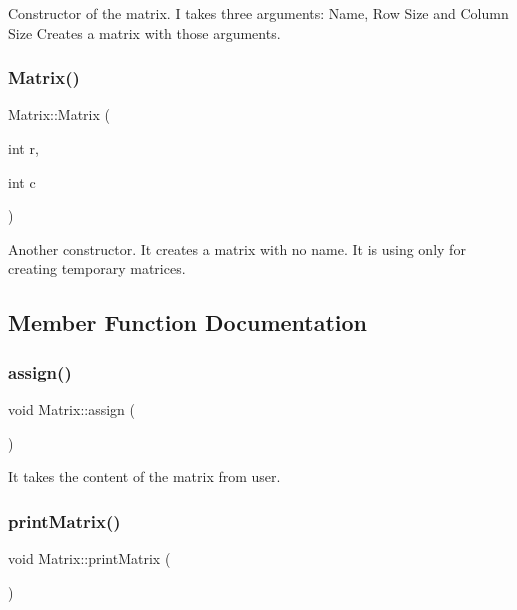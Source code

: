 Constructor of the matrix. I takes three arguments\+: Name, Row Size and Column Size Creates a matrix with those arguments. \mbox{\label{class_matrix_a07a3cee5bc286ca27ceffe81ce5a2d01}} 
\subsubsection{\texorpdfstring{Matrix()}{Matrix()}\hspace{0.1cm}{\footnotesize\ttfamily [2/2]}}
{\footnotesize\ttfamily Matrix\+::\+Matrix (\begin{DoxyParamCaption}\item[{int}]{r,  }\item[{int}]{c }\end{DoxyParamCaption})}



Another constructor. It creates a matrix with no name. It is using only for creating temporary matrices. 



\subsection{Member Function Documentation}
\mbox{\label{class_matrix_a5514edd105f92133665eee545230e3fd}} 
\subsubsection{\texorpdfstring{assign()}{assign()}}
{\footnotesize\ttfamily void Matrix\+::assign (\begin{DoxyParamCaption}{ }\end{DoxyParamCaption})}



It takes the content of the matrix from user. 

\mbox{\label{class_matrix_aa1967ad240a5ffaf492800044b7275d9}} 
\subsubsection{\texorpdfstring{print\+Matrix()}{printMatrix()}}
{\footnotesize\ttfamily void Matrix\+::print\+Matrix (\begin{DoxyParamCaption}{ }\end{DoxyParamCaption})}



